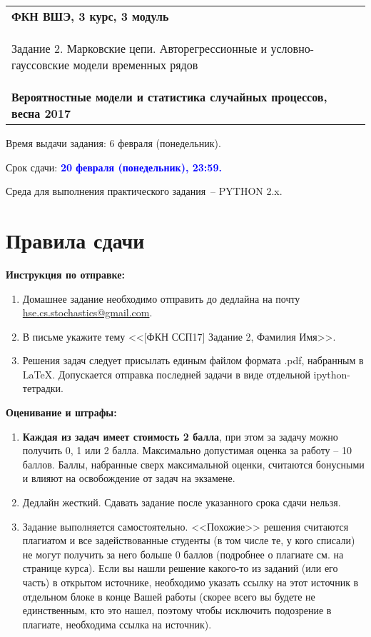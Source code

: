 \documentclass[a4paper,14pt]{extreport}
\renewcommand{\=}[1]{\stackrel{#1}{=}} %
\begin{document}
\begin{center}
    \begin{tabular}{|p{15.5cm}|}
        \hline
        \textbf{ФКН ВШЭ, 3 курс, 3 модуль}\\
        \begin{center} \Large Задание 2. Марковские цепи. Авторегрессионные
        и условно-гауссовские модели временных рядов
        \end{center}\\
        \textbf{Вероятностные модели и статистика случайных процессов, весна 2017}\\
        \hline
    \end{tabular}
\end{center}

Время выдачи задания: 6 февраля (понедельник).

Срок сдачи: \textcolor{blue}{\bf 20 февраля (понедельник), 23:59.}

Среда для выполнения практического задания~-- PYTHON 2.x.

\section*{Правила сдачи}

\textbf{Инструкция по отправке:} 
\begin{enumerate}
\item Домашнее задание необходимо отправить
до дедлайна на почту \href{mailto:hse.cs.stochastics@gmail.com}
{hse.cs.stochastics@gmail.com}.
\item В письме укажите тему 
<<[ФКН ССП17] Задание 2, Фамилия Имя>>.
\item Решения задач следует присылать единым файлом
формата .pdf, набранным в \LaTeX. Допускается отправка
последней задачи в виде отдельной ipython-тетрадки.
\end{enumerate}

\textbf{Оценивание и штрафы:} 
\begin{enumerate}
\item \textbf{Каждая из задач имеет стоимость 2 балла}, при этом
за задачу можно получить 0, 1 или 2 балла.
Максимально допустимая оценка за работу -- 10 баллов. 
Баллы, набранные сверх максимальной оценки, 
считаются бонусными и влияют на освобождение от задач на экзамене.
\item Дедлайн жесткий. Сдавать задание после указанного
срока сдачи нельзя.
\item Задание выполняется самостоятельно.
<<Похожие>> решения считаются плагиатом и все задействованные студенты (в том числе те, у кого списали) не могут получить за него больше 0 баллов (подробнее о плагиате см. на странице курса). Если вы нашли решение какого-то из заданий (или его часть) в открытом источнике, необходимо указать ссылку на этот источник в отдельном блоке в конце Вашей работы (скорее всего вы будете не единственным, кто это нашел, поэтому чтобы исключить подозрение в плагиате, необходима ссылка на источник).
\end{enumerate}
\end{document}
